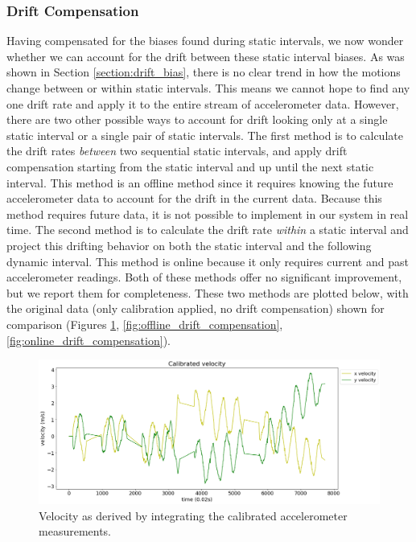 \documentclass{article}
\begin{document}
    \subsubsection{Drift Compensation}

      Having compensated for the biases found during static intervals, we now wonder whether we can account for the drift between these static interval biases. As was shown in Section \ref{section:drift_bias}, there is no clear trend in how the motions change between or within static intervals. This means we cannot hope to find any one drift rate and apply it to the entire stream of accelerometer data. However, there are two other possible ways to account for drift looking only at a single static interval or a single pair of static intervals. The first method is to calculate the drift rates \textit{between} two sequential static intervals, and apply drift compensation starting from the static interval and up until the next static interval. This method is an offline method since it requires knowing the future accelerometer data to account for the drift in the current data. Because this method requires future data, it is not possible to implement in our system in real time. The second method is to calculate the drift rate \textit{within} a static interval and project this drifting behavior on both the static interval and the following dynamic interval. This method is online because it only requires current and past accelerometer readings. Both of these methods offer no significant improvement, but we report them for completeness. These two methods are plotted below, with the original data (only calibration applied, no drift compensation) shown for comparison (Figures \ref{fig:calibrated_velocity_ref}, \ref{fig:offline_drift_compensation}, \ref{fig:online_drift_compensation}).

      \begin{figure}[H]
        \centering
        \includegraphics[width=0.85\linewidth]{./images/calibrated_velocity.png}
        \caption{Velocity as derived by integrating the calibrated accelerometer measurements.}
        \label{fig:calibrated_velocity_ref}
      \end{figure}
\end{document}
